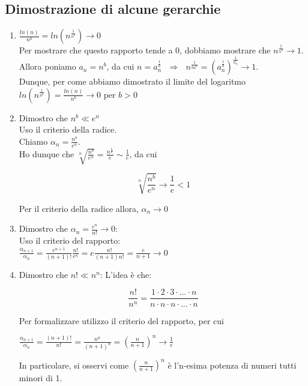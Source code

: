 \documentclass{article}
\theoremstyle{definition}
\begin{document}
\subsection{Dimostrazione di alcune gerarchie}
\begin{enumerate}
    \item $\frac{ln(n)}{n^b}=ln(n^{\frac{1}{n^b}}) \to 0$
    \\
    Per mostrare che questo rapporto tende a 0, dobbiamo mostrare che $n^{\frac{1}{n^b}}\to 1$.
    \\
    Allora poniamo $a_n=n^b$, da cui $n= a_n^{\frac{1}{b}} \,\,\,\, \Longrightarrow \,\,\,\, n^{\frac{1}{bn^b}}=(a_n^{\frac{1}{b}})^{\frac{1}{a_n}} \to 1$.
    \\
    Dunque, per come abbiamo dimostrato il limite del logaritmo $ln(n^{\frac{1}{n^b}})=\frac{ln(n)}{n^b} \to 0$ per $b > 0$
    \item Dimostro che $n^b\ll e^n$
    \\
    Uso il criterio della radice.
    \\
    Chiamo $\alpha_n=\frac{n^b}{e^n}$.
    \\
    Ho dunque che $\sqrt[n]{\frac{n^b}{e^n}}=\frac{n^{\frac{b}{n}}}{e}\sim \frac{1}{e}$, da cui
    \begin{center}
        \[\sqrt[n]{\frac{n^b}{e^n}}\longrightarrow\frac{1}{e}<1\]
    \end{center}
    Per il criterio della radice allora, $\alpha_n \longrightarrow0$
    \item Dimostro che $\alpha_n=\frac{e^n}{n!}\longrightarrow0$:
    \\
    Uso il criterio del rapporto:
    \\
    $\frac{\alpha_{n+1}}{\alpha_n}=\frac{e^{n+1}}{(n+1)!}\frac{n!}{e^n}=e\frac{n!}{(n+1)n!}=\frac{e}{n+1}\longrightarrow0$
\item Dimostro che $n! \ll n^n$:
L'idea è che:
\begin{center}
\[\frac{n!}{n^n}=\frac{1 \cdot 2 \cdot 3 \cdot ... \cdot n}{n \cdot n \cdot n \cdot...\cdot n }\]
\end{center}
Per formalizzare utilizzo il criterio del rapporto, per cui
\begin{center}
    $\frac{\alpha_{n+1}}{\alpha_n}=\frac{(n+1)!}{n!}=\frac{n^n}{(n+1)^n}=(\frac{n}{n+1})^n\longrightarrow \frac{1}{e}$
\end{center}
In particolare, si osservi come $(\frac{n}{n+1})^n $ è l'n-esima potenza di numeri tutti minori di 1.
\end{enumerate}
\end{document}
